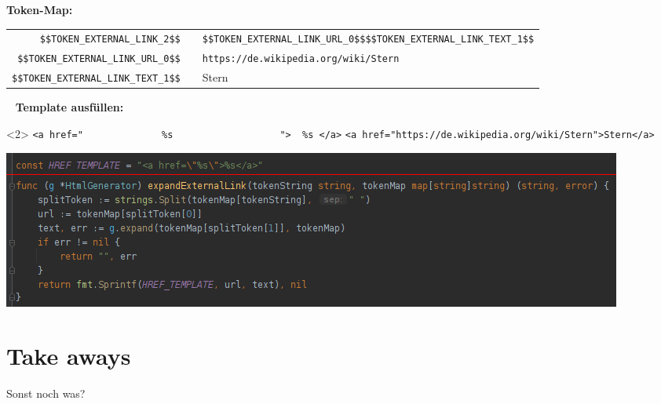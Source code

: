 \documentclass[9pt]{beamer}
\begin{document}
	\begin{frame}[fragile]
		\textbf{Token-Map:}\n
		\hspace{-0.65cm}
		\addtolength{\tabcolsep}{-0.5\tabcolsep}
		\begin{tabularx}{\textwidth}{rcp{6cm}}
			\verb+$$TOKEN_EXTERNAL_LINK_2$$+		& \textrightarrow & \verb+$$TOKEN_EXTERNAL_LINK_URL_0$$+\newline\verb+$$TOKEN_EXTERNAL_LINK_TEXT_1$$+\\
			\verb+$$TOKEN_EXTERNAL_LINK_URL_0$$+	& \textrightarrow & \verb+https://de.wikipedia.org/wiki/Stern+\\
			\verb+$$TOKEN_EXTERNAL_LINK_TEXT_1$$+	& \textrightarrow & Stern\\
		\end{tabularx}
		~\n\pause
		\textbf{Template ausfüllen:}\n
		\begin{onlyenv}<2>
			\verb+<a href="              %s                   ">  %s </a>+
			\verb+<a href="https://de.wikipedia.org/wiki/Stern">Stern</a>+
		\end{onlyenv}
		{
			\includegraphics[width=\linewidth]{images/code-html-generation.png}
		}
	\end{frame}
	
	\section{Take aways}
	
	\begin{frame}
		\vspace{1cm}
		\begin{center}
			Sonst noch was?
		\end{center}
	\end{frame}
\end{document}
